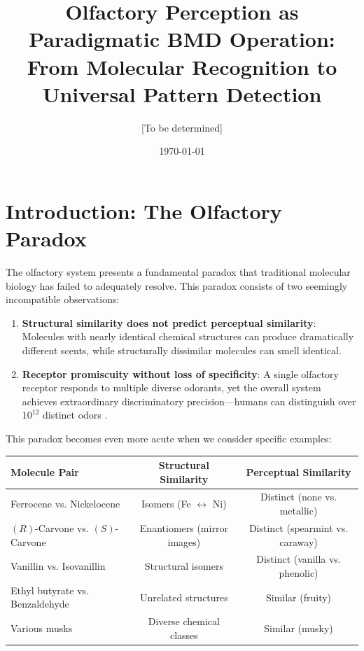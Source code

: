 \documentclass[11pt]{article}
\title{Olfactory Perception as Paradigmatic BMD Operation: From Molecular Recognition to Universal Pattern Detection}
\author{[To be determined]}
\date{\today}
\theoremstyle{remark}
\begin{document}
\maketitle

\section{Introduction: The Olfactory Paradox}

The olfactory system presents a fundamental paradox that traditional molecular biology has failed to adequately resolve. This paradox consists of two seemingly incompatible observations:

\begin{enumerate}
\item \textbf{Structural similarity does not predict perceptual similarity}: Molecules with nearly identical chemical structures can produce dramatically different scents, while structurally dissimilar molecules can smell identical.

\item \textbf{Receptor promiscuity without loss of specificity}: A single olfactory receptor responds to multiple diverse odorants, yet the overall system achieves extraordinary discriminatory precision—humans can distinguish over $10^{12}$ distinct odors \cite{bushdid2014humans}.
\end{enumerate}

This paradox becomes even more acute when we consider specific examples:

\begin{center}
\begin{tabular}{lcc}
\toprule
\textbf{Molecule Pair} & \textbf{Structural Similarity} & \textbf{Perceptual Similarity} \\
\midrule
Ferrocene vs. Nickelocene & Isomers (Fe $\leftrightarrow$ Ni) & Distinct (none vs. metallic) \\
$(R)$-Carvone vs. $(S)$-Carvone & Enantiomers (mirror images) & Distinct (spearmint vs. caraway) \\
Vanillin vs. Isovanillin & Structural isomers & Distinct (vanilla vs. phenolic) \\
\midrule
Ethyl butyrate vs. Benzaldehyde & Unrelated structures & Similar (fruity) \\
Various musks & Diverse chemical classes & Similar (musky) \\
\bottomrule
\end{tabular}
\end{center}
\end{document}
